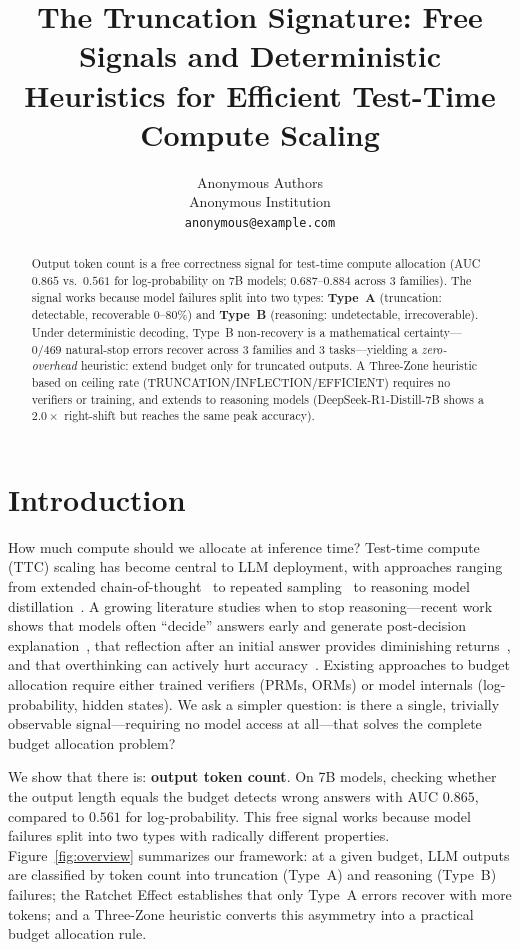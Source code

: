 \documentclass{article}
\title{The Truncation Signature: Free Signals and Deterministic Heuristics for Efficient Test-Time Compute Scaling}
\author{
  Anonymous Authors \\
  Anonymous Institution \\
  \texttt{anonymous@example.com}
}
\begin{document}
\maketitle

\begin{abstract}
Output token count is a free correctness signal for test-time compute allocation (AUC $0.865$ vs.\ $0.561$ for log-probability on 7B models; $0.687$--$0.884$ across 3 families). The signal works because model failures split into two types: \textbf{Type~A} (truncation: detectable, recoverable 0--80\%) and \textbf{Type~B} (reasoning: undetectable, irrecoverable). Under deterministic decoding, Type~B non-recovery is a mathematical certainty---$0/469$ natural-stop errors recover across 3 families and 3 tasks---yielding a \emph{zero-overhead} heuristic: extend budget only for truncated outputs. A Three-Zone heuristic based on ceiling rate (TRUNCATION/INFLECTION/EFFICIENT) requires no verifiers or training, and extends to reasoning models (DeepSeek-R1-Distill-7B shows a $2.0\times$ right-shift but reaches the same peak accuracy).
\end{abstract}

\section{Introduction}

How much compute should we allocate at inference time? Test-time compute (TTC) scaling has become central to LLM deployment, with approaches ranging from extended chain-of-thought~\cite{wei2022chain} to repeated sampling~\cite{brown2024large,snell2024scaling} to reasoning model distillation~\cite{guo2025deepseek}. A growing literature studies when to stop reasoning---recent work shows that models often ``decide'' answers early and generate post-decision explanation~\cite{decideearly2026}, that reflection after an initial answer provides diminishing returns~\cite{firsttry2025}, and that overthinking can actively hurt accuracy~\cite{morethinkinghurts2026}. Existing approaches to budget allocation require either trained verifiers (PRMs, ORMs) or model internals (log-probability, hidden states). We ask a simpler question: is there a single, trivially observable signal---requiring no model access at all---that solves the complete budget allocation problem?

We show that there is: \textbf{output token count}. On 7B models, checking whether the output length equals the budget detects wrong answers with AUC $0.865$, compared to $0.561$ for log-probability. This free signal works because model failures split into two types with radically different properties. Figure~\ref{fig:overview} summarizes our framework: at a given budget, LLM outputs are classified by token count into truncation (Type~A) and reasoning (Type~B) failures; the Ratchet Effect establishes that only Type~A errors recover with more tokens; and a Three-Zone heuristic converts this asymmetry into a practical budget allocation rule.
\end{document}
